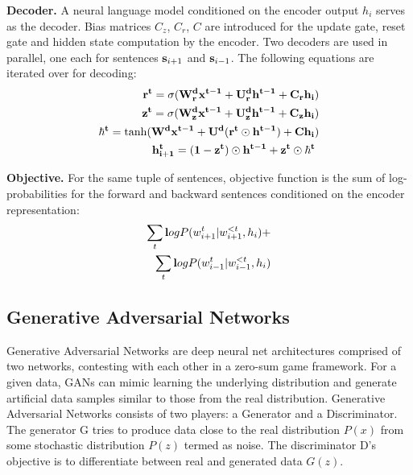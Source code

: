 \documentclass[11pt,a4paper]{article}
\begin{document}
\textbf{Decoder.} 
A neural language model conditioned on the encoder output \(h_i\) serves as the decoder. Bias matrices \(C_z\), \(C_r\), \(C\) are introduced for the update gate, reset gate and hidden state computation by the encoder. Two decoders are used in parallel, one each for sentences $\begin{mathbf}s_{i+1}\end{mathbf}$ and $\begin{mathbf}s_{i-1}\end{mathbf}$. 
The following equations are iterated over for decoding:
\begin{align*}
\begin{mathbf}    {r^{t} = \sigma({W_r^d} x^{t-1}+U_r^d h^{t-1} + C_rh_i)}\end{mathbf}\\
\begin{mathbf}    {z^{t} = \sigma(W_z^d x^{t-1}+U_z^d h^{t-1} + C_zh_i)}\end{mathbf}\\
\begin{mathbf}{\hbar^{t} = \tanh(W^d x^{t-1}+U^d(r^{t} \odot h^{t-1}) + Ch_i)}\end{mathbf}\\
\begin{mathbf}{h^{t}_{i+1} = (1-z^{t}) \odot h^{t-1}+ z^{t} \odot \hbar^{t}}\end{mathbf}\
\end{align*}

\textbf{Objective.} 
For the same tuple of sentences, objective function is the sum of log-probabilities 
for the forward and backward sentences conditioned on the encoder representation:\begin{align*}
    \sum_{t} \begin{mathbf} log P( 
    w_{i+1}^t|w_{i+1}^{<t}, h_i)
    \end{mathbf} + \\\sum_{t} \begin{mathbf} log P( 
    w_{i-1}^t|w_{i-1}^{<t}, h_i)
    \end{mathbf}
\end{align*}


\subsection{Generative Adversarial Networks}

Generative Adversarial Networks \cite{GAN}
are deep neural net architectures comprised of two networks,
contesting with each other in a zero-sum game framework.
For a given data, GANs can mimic learning the underlying distribution and generate artificial
data samples similar to those from the real distribution. Generative Adversarial
Networks consists of two players: a Generator and a Discriminator. The generator G
tries to produce data close to the real distribution \(P(x)\) from some  
stochastic distribution \(P(z)\) termed as noise. The discriminator D's
objective is to differentiate between real and generated data \(G(z)\).
\end{document}
